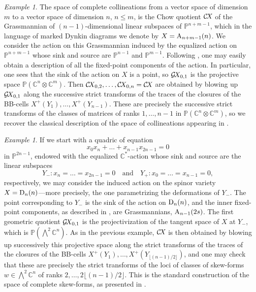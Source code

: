 \documentclass[10pt,a4paper]{article}
\numberwithin{equation}{section}
\theoremstyle{definition}
\theoremstyle{remark}
\newtheorem{example}[theorem]{Example}
\def\C{{\mathbb C}}
\def\P{{\mathbb P}}
\def\DA{{\rm A}}
\def\DD{{\rm D}}
\def\GX{\mathcal{G}\!X\hspace{-0.5pt}}
\def\CX{\mathcal{C}\!X\hspace{-0.5pt}}
\begin{document}
\begin{example}\label{ex:classicex1}
The space of complete collineations from a vector space of dimension $m$ to a vector space of dimension $n$, $n\leq m$, is the Chow quotient $\CX$ of the Grassmannian of $(n-1)$-dimensional linear subspaces of $\P^{n+m-1}$,  which in the language of marked Dynkin diagrams we denote by $X=\DA_{n+m-1}(n)$. We consider the action on this Grassmannian induced by the equalized action on $\P^{n+m-1}$ whose sink and source are  $\P^{n-1}$ and  $\P^{m-1}$. Following \cite{WORS5,FS}, one may easily obtain a description of all the fixed-point components of the action. In particular, one sees that the sink of the action on $X$ is a point, so $\GX_{0,1}$ is the projective space $\P(\C^n\otimes\C^m)$. Then $\CX_{0,2},\dots,\CX_{0,n}=\CX$ are obtained  by blowing up $\GX_{0,1}$ along the successive strict transforms of the traces of the closures of the BB-cells $X^+(Y_1), \dots, X^+(Y_{n-1})$. These are precisely the successive strict transforms of the classes of matrices of ranks $1,\dots,n-1$ in $\P(\C^n\otimes\C^m)$,  so we recover the classical description of the space of collineations appearing in \cite{Vai84}.
\end{example}

\begin{example}\label{ex:classicex2}
  If we start with a quadric of equation \[x_0x_{n}+\dots+x_{n-1}x_{2n-1}=0\] in $\P^{2n-1}$, endowed with the equalized $\C^*$-action whose sink and source are the linear subspaces
  \[Y_-:x_n=\dots=x_{2n-1}=0\quad\mbox{and}\quad Y_+:x_0=\dots=x_{n-1}=0,\]
respectively, we may consider the induced action on the spinor variety $X=\DD_n(n)$---more precisely,  the one parametrizing the deformations of $Y_-$. The point corresponding to $Y_-$ is the sink of the action on $\DD_n(n)$, and the inner fixed-point components, as described in \cite{FS}, are Grassmannians, $\DA_{n-1}(2s)$. The first geometric quotient $\GX_{0,1}$ is the projectivization of the tangent space of $X$ at $Y_-$, which is $\P(\bigwedge^2\C^n)$. As in the previous example, $\CX$ is then obtained by blowing up successively  this projective space along the  strict transforms of the traces of the closures of the BB-cells $X^+(Y_1), \dots, X^+(Y_{\lfloor(n-1)/2\rfloor})$, and one may check that these are precisely the strict transforms of the loci of classes of skew-forms $w\in \bigwedge^2\C^n$ of ranks $2,\dots, 2\lfloor(n-1)/2\rfloor$. This is the standard construction of the space of complete skew-forms, as presented in \cite{Thaddeus}.
\end{example}
\end{document}
